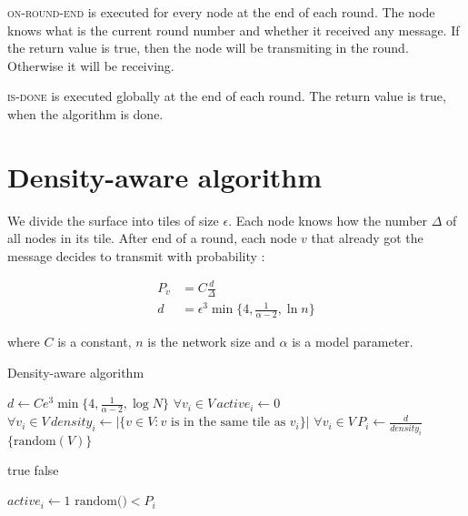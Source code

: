 \documentclass[a4paper,draft,12pt]{report}
\begin{document}
\textsc{on-round-end} is executed for every node at the end of each round. The node knows what is the current round number and whether it received any message. If the return  value  is true, then the node will be transmiting in the round. Otherwise it will be receiving.

\textsc{is-done} is executed globally at the end of each round. The return value is true, when the algorithm is done.

\section{Density-aware algorithm}

We divide the surface into tiles of size $\epsilon$. Each node knows how the number $\Delta$ of all nodes in its tile. After end of a round, each node $v$ that already got the message decides to transmit with probability :

\begin{align}
\label{eq:dens_alg_prob}
P_v &= C  \frac{d}{\Delta} \\
d &= \epsilon^3  \min\{4, \frac{1}{\alpha - 2}, \ln n\} \nonumber
\end{align}

where $C$ is a constant, $n$ is the network size and $\alpha$ is a model  parameter.

\begin{algorithm}
\caption{Density-aware algorithm}
\label{a:density}
\begin{algorithmic}
        \State $d \gets C e^3 \min\{4, \frac{1}{\alpha - 2}, \log N\}$
        \State $\forall v_i \in V \, active_i \gets 0$
        \State $\forall v_i \in V \,density_i \gets |\{v \in V :  v \text{ is in the same tile as } v_i\}|$
        \State $\forall v_i \in V \,P_i \gets \frac{d}{density_i}$
        \State \Return $\{\text{random}(V)\}$
\EndFunction

\Statex

		\State \Return true
	\Else
		\State \Return false
	\EndIf
\EndFunction

\Statex

		\State $active_i \gets 1$
	\EndIf
		\State \Return $\text{random()} < P_i$
	\Else
		\State {}
	\EndIf 
\EndFunction
\end{algorithmic}
\end{algorithm}
\end{document}
